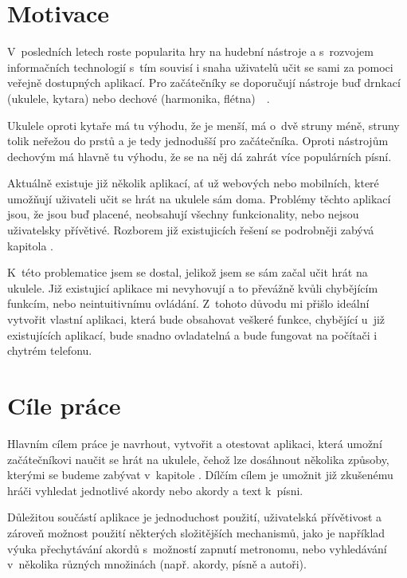 \begin{introduction}
    \label{ch:introduction}
    \section{Motivace}
    V~posledních letech roste popularita hry na hudební nástroje a s~rozvojem informačních technologií s~tím souvisí i snaha uživatelů učit se sami za pomoci veřejně dostupných aplikací. Pro začátečníky se doporučují nástroje buď drnkací (ukulele, kytara) nebo dechové (harmonika, flétna)~\cite{s_2016_the}~\cite{richardson_2019_top}.

    Ukulele oproti kytaře má tu výhodu, že je menší, má o~dvě struny méně, struny tolik neřežou do prstů a je tedy jednodušší pro začátečníka. Oproti nástrojům dechovým má hlavně tu výhodu, že se na něj dá zahrát více populárních písní.

    Aktuálně existuje již několik aplikací, ať už webových nebo mobilních, které umožňují uživateli učit se hrát na ukulele sám doma. Problémy těchto aplikací jsou, že jsou buď placené, neobsahují všechny funkcionality, nebo nejsou uživatelsky přívětivé. Rozborem již existujicích řešení se podrobněji zabývá kapitola .

    K~této problematice jsem se dostal, jelikož jsem se sám začal učit hrát na ukulele. Již existujicí aplikace mi nevyhovují a to převážně kvůli chybějícím funkcím, nebo neintuitivnímu ovládání. Z~tohoto důvodu mi přišlo ideální vytvořit vlastní aplikaci, která bude obsahovat veškeré funkce, chybějící u~již existujících aplikací, bude snadno ovladatelná a bude fungovat na počítači i chytrém telefonu.


    \section{Cíle práce}
    Hlavním cílem práce je navrhout, vytvořit a otestovat aplikaci, která umožní začátečníkovi naučit se hrát na ukulele, čehož lze dosáhnout několika způsoby, kterými se budeme zabývat v~kapitole . Dílčím cílem je umožnit již zkušenému hráči vyhledat jednotlivé akordy nebo akordy a text k~písni.

    Důležitou součástí aplikace je jednoduchost použití, uživatelská přívětivost a zároveň možnost použití některých složitějších mechanismů, jako je například výuka přechytávání akordů s~možností zapnutí metronomu, nebo vyhledávání v~několika různých množinách (např. akordy, písně a autoři).


\end{introduction}
